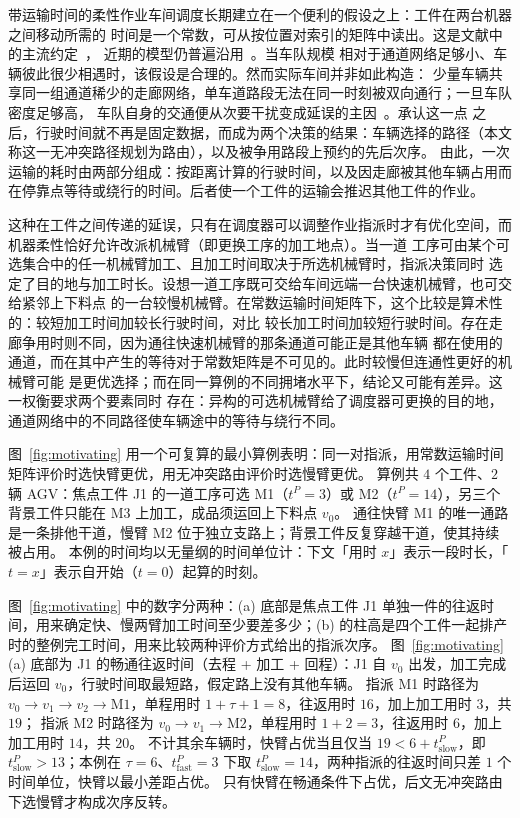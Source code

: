 \documentclass[manuscript,screen,review]{acmart}
\begin{document}
带运输时间的柔性作业车间调度长期建立在一个便利的假设之上：工件在两台机器之间移动所需的
时间是一个常数，可从按位置对索引的矩阵中读出。这是文献中的主流约定~\cite{xin2025review}，
近期的模型仍普遍沿用~\cite{meng2025cp,qin2026knowledge,jafarian2026integrated}。当车队规模
相对于通道网络足够小、车辆彼此很少相遇时，该假设是合理的。然而实际车间并非如此构造：
少量车辆共享同一组通道稀少的走廊网络，单车道路段无法在同一时刻被双向通行；一旦车队密度足够高，
车队自身的交通便从次要干扰变成延误的主因~\cite{kim2026congestion}。承认这一点
之后，行驶时间就不再是固定数据，而成为两个决策的结果：车辆选择的路径（本文称这一无冲突路径规划为路由），以及被争用路段上预约的先后次序。
由此，一次运输的耗时由两部分组成：按距离计算的行驶时间，以及因走廊被其他车辆占用而在停靠点等待或绕行的时间。后者使一个工件的运输会推迟其他工件的作业。

这种在工件之间传递的延误，只有在调度器可以调整作业指派时才有优化空间，而机器柔性恰好允许改派机械臂（即更换工序的加工地点）。当一道
工序可由某个可选集合中的任一机械臂加工、且加工时间取决于所选机械臂时，指派决策同时
选定了目的地与加工时长。设想一道工序既可交给车间远端一台快速机械臂，也可交给紧邻上下料点
的一台较慢机械臂。在常数运输时间矩阵下，这个比较是算术性的：较短加工时间加较长行驶时间，对比
较长加工时间加较短行驶时间。存在走廊争用时则不同，因为通往快速机械臂的那条通道可能正是其他车辆
都在使用的通道，而在其中产生的等待对于常数矩阵是不可见的。此时较慢但连通性更好的机械臂可能
是更优选择；而在同一算例的不同拥堵水平下，结论又可能有差异。这一权衡要求两个要素同时
存在：异构的可选机械臂给了调度器可更换的目的地，通道网络中的不同路径使车辆途中的等待与绕行不同。

图~\ref{fig:motivating} 用一个可复算的最小算例表明：同一对指派，用常数运输时间矩阵评价时选快臂更优，用无冲突路由评价时选慢臂更优。
算例共 $4$ 个工件、$2$ 辆 AGV：焦点工件 J1 的一道工序可选 M1（$t^P=3$）或 M2（$t^P=14$），另三个背景工件只能在 M3 上加工，成品须运回上下料点 $v_0$。
通往快臂 M1 的唯一通路是一条排他干道，慢臂 M2 位于独立支路上；背景工件反复穿越干道，使其持续被占用。
本例的时间均以无量纲的时间单位计：下文「用时 $x$」表示一段时长，「$t=x$」表示自开始（$t=0$）起算的时刻。

图~\ref{fig:motivating} 中的数字分两种：(a) 底部是焦点工件 J1 单独一件的往返时间，用来确定快、慢两臂加工时间至少要差多少；(b) 的柱高是四个工件一起排产时的整例完工时间，用来比较两种评价方式给出的指派次序。
图~\ref{fig:motivating}(a) 底部为 J1 的畅通往返时间（去程 + 加工 + 回程）：J1 自 $v_0$ 出发，加工完成后运回 $v_0$，行驶时间取最短路，假定路上没有其他车辆。
指派 M1 时路径为 $v_0\to v_1\to v_2\to\mathrm{M1}$，单程用时 $1+\tau+1=8$，往返用时 $16$，加上加工用时 $3$，共 $19$；
指派 M2 时路径为 $v_0\to v_1\to\mathrm{M2}$，单程用时 $1+2=3$，往返用时 $6$，加上加工用时 $14$，共 $20$。
不计其余车辆时，快臂占优当且仅当 $19<6+t^P_{\text{slow}}$，即 $t^P_{\text{slow}}>13$；本例在 $\tau=6$、$t^P_{\text{fast}}=3$ 下取 $t^P_{\text{slow}}=14$，两种指派的往返时间只差 $1$ 个时间单位，快臂以最小差距占优。
只有快臂在畅通条件下占优，后文无冲突路由下选慢臂才构成次序反转。
\end{document}
